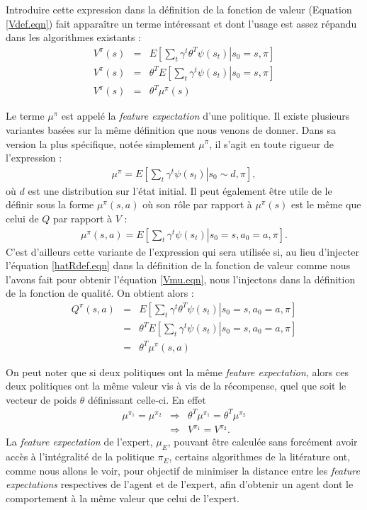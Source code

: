 \documentclass[publibook-draft]{CAp2012}
\begin{document}
Introduire cette expression dans la définition de la fonction de valeur (Equation \ref{Vdef.eqn}) fait apparaître un terme intéressant et dont l'usage est assez répandu dans les algorithmes existants :
\begin{eqnarray}
V^\pi(s) &=& E\left[\left.\sum_t\gamma^t\theta^T\psi(s_t)\right|s_0=s,\pi\right]\\
V^\pi(s) &=& \theta^TE\left[\left.\sum_t\gamma^t\psi(s_t)\right|s_0=s,\pi\right]\\
V^\pi(s) &=& \theta^T\mu^\pi(s)
\label{Vmu.eqn}
\end{eqnarray}

Le terme $\mu^\pi$ est appelé la {\it feature expectation} d'une politique. Il existe plusieurs variantes basées sur la même définition que nous venons de donner. Dans sa version la plus spécifique, notée simplement $\mu^\pi$, il s'agit en toute rigueur de l'expression :
\begin{eqnarray}
\mu^\pi = E\left[\left.\sum_t\gamma^t\psi(s_t)\right|s_0\sim d,\pi\right],
\end{eqnarray}
où $d$ est une distribution sur l'état initial. Il peut également être utile de le définir sous la forme $\mu^\pi(s,a)$ où son rôle par rapport à $\mu^\pi(s)$ est le même que celui de $Q$ par rapport à $V$ :
\begin{eqnarray}
\mu^\pi(s,a) = E\left[\left.\sum_t\gamma^t\psi(s_t)\right|s_0=s,a_0=a,\pi\right].
\end{eqnarray}
C'est d'ailleurs cette variante de l'expression qui sera utilisée si, au lieu d'injecter l'équation \ref{hatRdef.eqn} dans la définition de la fonction de valeur comme nous l'avons fait pour obtenir l'équation \ref{Vmu.eqn}, nous l'injectons dans la définition de la fonction de qualité. On obtient alors :
\begin{eqnarray}
Q^\pi(s,a) &=& E\left[\left.\sum_t\gamma^t\theta^T\psi(s_t)\right|s_0=s,a_0=a,\pi\right]\\
 &=& \theta^TE\left[\left.\sum_t\gamma^t\psi(s_t)\right|s_0=s,a_0=a,\pi\right]\\
 &=& \theta^T\mu^\pi(s,a)
\label{Qmu.eqn}
\end{eqnarray}

On peut noter que si deux politiques ont la même {\it feature expectation}, alors ces deux politiques ont la même valeur vis à vis de la récompense, quel que soit le vecteur de poids $\theta$ définissant celle-ci. En effet
\begin{eqnarray}
\mu^{\pi_1} = \mu^{\pi_2} &\Rightarrow& \theta^T\mu^{\pi_1} = \theta^T\mu^{\pi_2}\\
& \Rightarrow& V^{\pi_1} = V^{\pi_2}.
\end{eqnarray}
La {\it feature expectation} de l'expert, $\mu_E$, pouvant être calculée sans forcément avoir accès à l'intégralité de la politique $\pi_E$, certains algorithmes de la litérature ont, comme nous allons le voir, pour objectif de minimiser la distance entre les {\it feature expectations} respectives de l'agent et de l'expert, afin d'obtenir un agent dont le comportement à la même valeur que celui de l'expert.
\end{document}
